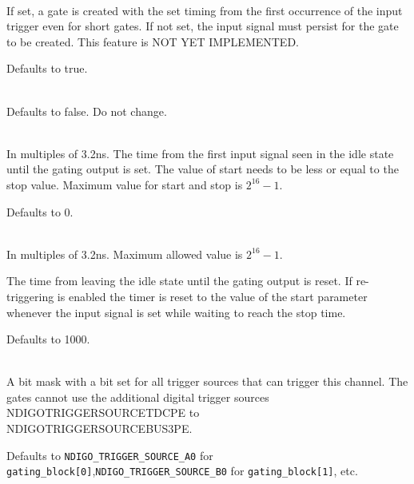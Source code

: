             \\
            If set, a gate is created with the set timing from the first occurrence of the input trigger even for short gates. If not set, the input signal must persist for the gate to be created. This feature is NOT YET IMPLEMENTED.\par

            Defaults to true.\par

            \\
            Defaults to false. Do not change.\par

            \\
            In multiples of 3.2ns. The time from the first input signal seen in the idle state until the gating output is set. The value of start needs to be less or equal to the stop value. Maximum value for start and stop is $2^{16}-1$.\par

            Defaults to 0.\par

            \\
            In multiples of 3.2ns. Maximum allowed value is $2^{16}-1$.\par

            The time from leaving the idle state until the gating output is reset. If re-triggering is enabled the timer is reset to the value of the start parameter whenever the input signal is set while waiting to reach the stop time.\par

            Defaults to 1000.\par

            \\
            A bit mask with a bit set for all trigger sources that can trigger this channel. The gates cannot use the additional digital trigger sources \textsf{NDIGO\tu TRIGGER\tu SOURCE\tu TDC\tu PE} to\\ \textsf{NDIGO\tu TRIGGER\tu SOURCE\tu BUS3\tu PE}.\par

            Defaults to \texttt{NDIGO\_TRIGGER\_SOURCE\_A0} for \texttt{gating\_block[0]},\newline\texttt{NDIGO\_TRIGGER\_SOURCE\_B0} for \texttt{gating\_block[1]}, etc.

